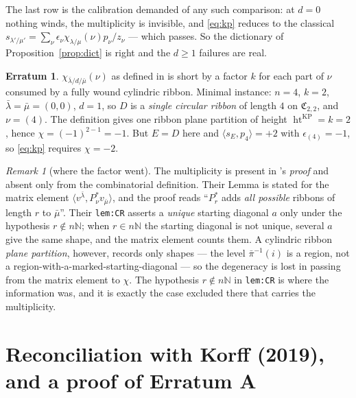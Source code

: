 \documentclass[11pt]{article}
\theoremstyle{plain}
\theoremstyle{definition}
\newtheorem{erratum}[theorem]{Erratum}
\theoremstyle{remark}
\newtheorem{remark}[theorem]{Remark}
\DeclareMathOperator{\hgt}{ht}
\newcommand{\CC}{\mathfrak{C}}
\newcommand{\bl}{\bar\lambda}
\newcommand{\bm}{\bar\mu}
\begin{document}
The last row is the calibration demanded of any such comparison: at $d=0$ nothing winds, the
multiplicity is invisible, and \eqref{eq:kp} reduces to the classical
$s_{\lambda'/\mu'}=\sum_\nu\epsilon_\nu\chi_{\lambda/\mu}(\nu)p_\nu/z_\nu$ --- which passes. So the
dictionary of Proposition~\ref{prop:dict} is right and the $d\ge1$ failures are real.

\begin{erratum}\label{err:kp}
$\chi_{\bl/d/\bm}(\nu)$ as defined in \cite{KP} is short by a factor $k$ for each part of $\nu$
consumed by a fully wound cylindric ribbon. Minimal instance: $n=4$, $k=2$, $\bl=\bm=(0,0)$, $d=1$,
so $D$ is a \emph{single circular ribbon} of length $4$ on $\CC_{2,2}$, and $\nu=(4)$. The
definition gives one ribbon plane partition of height $\hgt^{\mathrm{KP}}=k=2$, hence
$\chi=(-1)^{2-1}=-1$. But $E=D$ here and $\langle s_E,p_4\rangle=+2$ with
$\epsilon_{(4)}=-1$, so \eqref{eq:kp} requires $\chi=-2$.
\end{erratum}

\begin{remark}[where the factor went]
The multiplicity is present in \cite{KP}'s \emph{proof} and absent only from the combinatorial
definition. Their Lemma is stated for the matrix element
$\langle v^{\bl},P^*_\nu v_{\bm}\rangle$, and the proof reads ``$P^*_r$ adds \emph{all possible}
ribbons of length $r$ to $\bm$''. Their \texttt{lem:CR} asserts a \emph{unique} starting diagonal
$a$ only under the hypothesis $r\notin n\mathbb{N}$; when $r\in n\mathbb{N}$ the starting diagonal is
not unique, several $a$ give the same shape, and the matrix element counts them. A cylindric ribbon
\emph{plane partition}, however, records only shapes --- the level $\bar\pi^{-1}(i)$ is a region, not
a region-with-a-marked-starting-diagonal --- so the degeneracy is lost in passing from the matrix
element to $\chi$. The hypothesis $r\notin n\mathbb{N}$ in \texttt{lem:CR} is where the information
was, and it is exactly the case excluded there that carries the multiplicity.
\end{remark}

\section{Reconciliation with Korff (2019), and a proof of Erratum A}\label{sec:korff}
\end{document}
